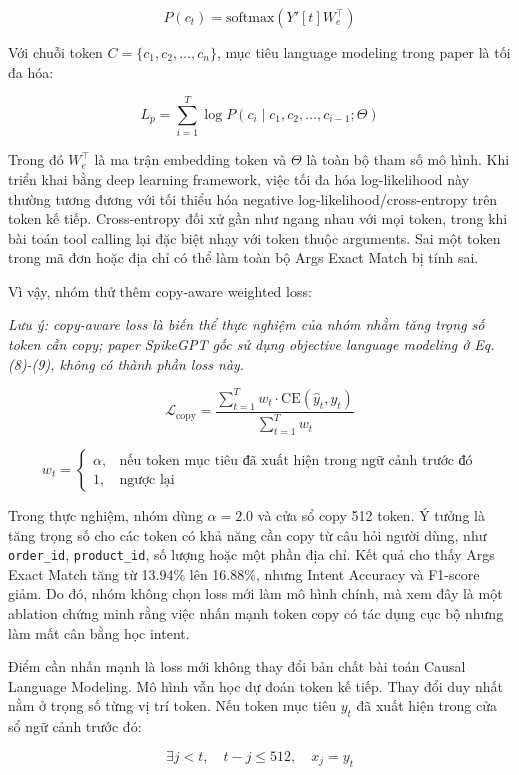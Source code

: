 \documentclass[12pt,a4paper,oneside]{report}
\newlength{\manualparindent}
\newcommand{\manualindent}{\hspace*{\manualparindent}}
\begin{document}
\[
P(c_t)=\mathrm{softmax}\left(Y'[t]W_e^\top\right)
\]

Với chuỗi token \(C=\{c_1,c_2,\ldots,c_n\}\), mục tiêu language modeling trong paper là tối đa hóa:

\[
L_p=\sum_{i=1}^{T}
\log P(c_i\mid c_1,c_2,\ldots,c_{i-1};\Theta)
\]

\manualindent%
Trong đó \(W_e^\top\) là ma trận embedding token và \(\Theta\) là toàn bộ tham số mô hình. Khi triển khai bằng deep learning framework, việc tối đa hóa log-likelihood này thường tương đương với tối thiểu hóa negative log-likelihood/cross-entropy trên token kế tiếp. Cross-entropy đối xử gần như ngang nhau với mọi token, trong khi bài toán tool calling lại đặc biệt nhạy với token thuộc arguments. Sai một token trong mã đơn hoặc địa chỉ có thể làm toàn bộ Args Exact Match bị tính sai.

\manualindent%
Vì vậy, nhóm thử thêm copy-aware weighted loss:

\manualindent%
\textit{Lưu ý: copy-aware loss là biến thể thực nghiệm của nhóm nhằm tăng trọng số token cần copy; paper SpikeGPT gốc sử dụng objective language modeling ở Eq. (8)-(9), không có thành phần loss này.}

\[
\mathcal{L}_{\mathrm{copy}} =
\frac{\sum_{t=1}^{T} w_t \cdot \mathrm{CE}(\hat{y}_t, y_t)}
{\sum_{t=1}^{T} w_t}
\]

\[
w_t =
\begin{cases}
\alpha, & \text{nếu token mục tiêu đã xuất hiện trong ngữ cảnh trước đó} \\
1, & \text{ngược lại}
\end{cases}
\]

\manualindent%
Trong thực nghiệm, nhóm dùng \(\alpha = 2.0\) và cửa sổ copy 512 token. Ý tưởng là tăng trọng số cho các token có khả năng cần copy từ câu hỏi người dùng, như \texttt{order\_id}, \texttt{product\_id}, số lượng hoặc một phần địa chỉ. Kết quả cho thấy Args Exact Match tăng từ 13.94\% lên 16.88\%, nhưng Intent Accuracy và F1-score giảm. Do đó, nhóm không chọn loss mới làm mô hình chính, mà xem đây là một ablation chứng minh rằng việc nhấn mạnh token copy có tác dụng cục bộ nhưng làm mất cân bằng học intent.

\manualindent%
Điểm cần nhấn mạnh là loss mới không thay đổi bản chất bài toán Causal Language Modeling. Mô hình vẫn học dự đoán token kế tiếp. Thay đổi duy nhất nằm ở trọng số từng vị trí token. Nếu token mục tiêu \(y_t\) đã xuất hiện trong cửa sổ ngữ cảnh trước đó:

\[
\exists j < t,\quad t-j \le 512,\quad x_j = y_t
\]
\end{document}
